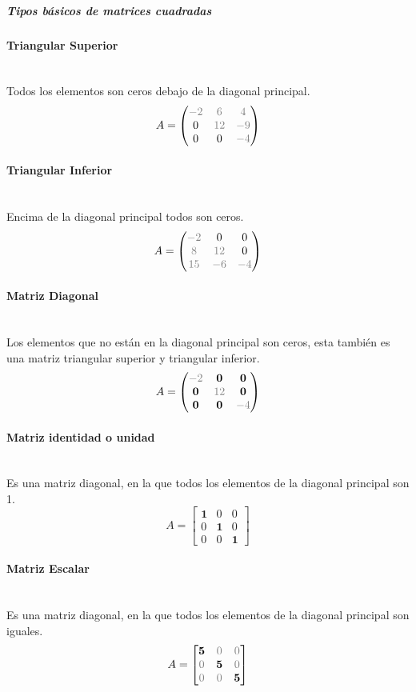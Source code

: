 \documentclass[stu, 12pt, letterpaper, donotrepeattitle, floatsintext, natbib]{apa7}
\newcommand{\myparagraph}[1]{\paragraph{#1}\mbox{}\\}
\begin{document}
    \subparagraph{Tipos básicos de matrices cuadradas}
    \myparagraph{Triangular Superior}
    Todos los elementos son ceros debajo de la diagonal principal.
    \[
        A=\begin{pmatrix}
              \color{gray} -2 & \color{gray} 6  & \color{gray} 4  \\
              0               & \color{gray} 12 & \color{gray} -9 \\
              0               & 0               & \color{gray} -4
        \end{pmatrix}
    \]
    \myparagraph{Triangular Inferior}
    Encima de la diagonal principal todos son ceros.
    \[
        A=\begin{pmatrix}
              \color{gray} -2 & 0               & 0               \\
              \color{gray} 8  & \color{gray} 12 & 0               \\
              \color{gray} 15 & \color{gray} -6 & \color{gray} -4
        \end{pmatrix}
    \]
    \myparagraph{Matriz Diagonal}
    Los elementos que no están en la diagonal principal son ceros, esta también es una matriz triangular superior y triangular inferior.
    \[
        A=\begin{pmatrix}
              \color{gray} -2 & \textbf{0}      & \textbf{0}      \\
              \textbf{0}      & \color{gray} 12 & \textbf{0}      \\
              \textbf{0}      & \textbf{0}      & \color{gray} -4
        \end{pmatrix}
    \]
    \myparagraph{Matriz identidad o unidad}
    Es una matriz diagonal, en la que todos los elementos de la diagonal principal son 1.
    \[
        A=\begin{bmatrix}
              \textbf{1} & 0          & 0          \\
              0          & \textbf{1} & 0          \\
              0          & 0          & \textbf{1}
        \end{bmatrix}
    \]
    \myparagraph{Matriz Escalar}
    Es una matriz diagonal, en la que todos los elementos de la diagonal principal son iguales.
    \[
        A=\begin{bmatrix}
              \textbf{5}     & \color{gray} 0 & \color{gray} 0 \\
              \color{gray} 0 & \textbf{5}     & \color{gray} 0 \\
              \color{gray}0  & \color{gray} 0 & \textbf{5}
        \end{bmatrix}
    \]
\end{document}
